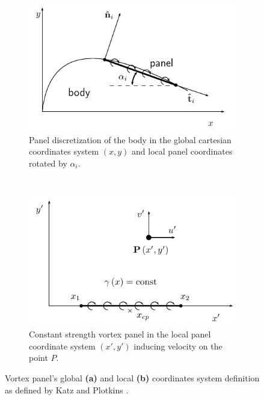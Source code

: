 \begin{figure}[t]
        \centering
        \begin{subfigure}[b]{0.5\textwidth}
                \includegraphics[width=\textwidth]{figures/lagrangian/panelCoordinateDefinition.pdf}
                \caption{Panel discretization of the body in the global cartesian coordinates system $\left(x,y\right)$ and local panel coordinates rotated by $\alpha_i$.}
                \label{fig:panelCoordinateDefinition}
        \end{subfigure}%
        ~ %
        \begin{subfigure}[b]{0.5\textwidth}
                \includegraphics[width=\textwidth]{figures/lagrangian/vortexPanelDefinition.pdf}
                \caption{Constant strength vortex panel in the local panel coordinate system $\left(x',y'\right)$ inducing velocity on the point $P$.}
                \label{fig:vortexPanelDefinition}
        \end{subfigure}
        \caption{Vortex panel's global \textbf{(a)} and local \textbf{(b)} coordinates system definition as defined by Katz and Plotkins \cite{Katz2001a}.}
        \label{fig:panelDefinitions}
\end{figure}	
	
